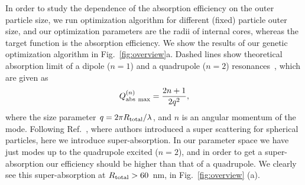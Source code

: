 \documentclass[aps,prl,twocolumn,showpacs,superscriptaddress,groupedaddress]{revtex4-1}
\begin{document}
\begin{figure}
\end{figure}
%
In order to study the dependence of the absorption efficiency on the
outer particle size, we run optimization algorithm for different
(fixed) particle outer size, and our optimization parameters are the
radii of internal cores, whereas the target function is the absorption
efficiency.  We show the results of our genetic optimization algorithm
in Fig.~\ref{fig:overview}a.  Dashed lines show theoretical absorption
limit of a dipole ($n=1$) and a quadrupole ($n=2$)
resonances~\cite{Tribelsky-2011}, which are given as $$Q^{(n)}_{\rm abs\
  max}=\frac{2n+1}{2q^2},$$ where the size parameter $q=2\pi R_{\rm
  total}/\lambda$, and $n$ is an angular momentum of the
mode. Following Ref.~\cite{Fan-2011}, where authors introduced a super
scattering for spherical particles, here we introduce
super-absorption. In our parameter space we have just modes up to the quadrupole
excited ($n=2$), and in order to get a super-absorption our efficiency
should be higher than that of a quadrupole. We clearly see this
super-absorption at $R_{\rm total}>60$~nm, in Fig.~\ref{fig:overview}
(a).
\end{document}
